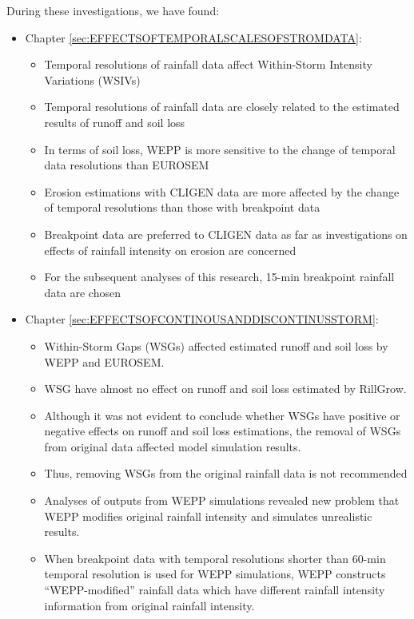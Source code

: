 During these investigations, we have found:
\begin{itemize}
  \item Chapter \ref{sec:EFFECTSOFTEMPORALSCALESOFSTROMDATA}:
  \begin{itemize}
      \item Temporal resolutions of rainfall data affect Within-Storm Intensity
Variations (WSIVs)
      \item Temporal resolutions of rainfall data are closely related to the
estimated results of runoff and soil loss
      \item In terms of soil loss, WEPP is more sensitive to the change of
temporal data resolutions than EUROSEM
      \item Erosion estimations with CLIGEN data are more affected by the change
of temporal resolutions than those with breakpoint data
      \item Breakpoint data are preferred to CLIGEN data as far as
investigations on effects of rainfall intensity on erosion are concerned
      \item For the subsequent analyses of this research, 15-min breakpoint
rainfall data are chosen
  \end{itemize}
  \item Chapter \ref{sec:EFFECTSOFCONTINOUSANDDISCONTINUSSTORM}:
    \begin{itemize}
      \item Within-Storm Gaps (WSGs) affected estimated runoff and soil loss by
WEPP and EUROSEM.
      \item WSG have almost no effect on runoff and soil loss estimated by
RillGrow.
      \item Although it was not evident to conclude whether WSGs have
positive or negative effects on runoff and soil loss estimations, the removal
of WSGs from original data affected model simulation results.
      \item Thus, removing WSGs from the original rainfall data is not
recommended
      \item Analyses of outputs from WEPP simulations revealed new problem
that WEPP modifies original rainfall intensity and simulates unrealistic
results.
      \item When breakpoint data with temporal resolutions shorter than
60-min temporal resolution is used for WEPP simulations, WEPP constructs
``WEPP-modified'' rainfall data which have different rainfall intensity
information from original rainfall intensity.
    \end{itemize}

\end{itemize}
